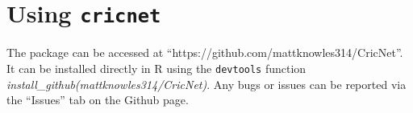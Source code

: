 
\section{Using \verb|cricnet|}
The package can be accessed at ``https://github.com/mattknowles314/CricNet''. It can be installed directly in R using the \verb|devtools| function \textit{install_github(mattknowles314/CricNet)}. Any bugs or issues can be reported via the ``Issues'' tab on the Github page. 
